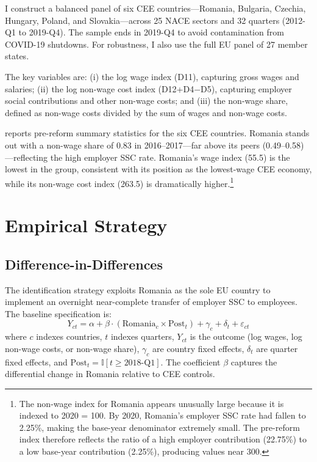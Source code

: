 \documentclass[12pt]{article}
\newcommand{\ind}{\mathbb{I}}
\begin{document}
I construct a balanced panel of six CEE countries---Romania, Bulgaria, Czechia, Hungary, Poland, and Slovakia---across 25 NACE sectors and 32 quarters (2012-Q1 to 2019-Q4). The sample ends in 2019-Q4 to avoid contamination from COVID-19 shutdowns. For robustness, I also use the full EU panel of 27 member states.

The key variables are: (i) the log wage index (D11), capturing gross wages and salaries; (ii) the log non-wage cost index (D12+D4$-$D5), capturing employer social contributions and other non-wage costs; and (iii) the non-wage share, defined as non-wage costs divided by the sum of wages and non-wage costs.

 reports pre-reform summary statistics for the six CEE countries. Romania stands out with a non-wage share of 0.83 in 2016--2017---far above its peers (0.49--0.58)---reflecting the high employer SSC rate. Romania's wage index (55.5) is the lowest in the group, consistent with its position as the lowest-wage CEE economy, while its non-wage cost index (263.5) is dramatically higher.\footnote{The non-wage index for Romania appears unusually large because it is indexed to 2020 = 100. By 2020, Romania's employer SSC rate had fallen to 2.25\%, making the base-year denominator extremely small. The pre-reform index therefore reflects the ratio of a high employer contribution (22.75\%) to a low base-year contribution (2.25\%), producing values near 300.}




\section{Empirical Strategy}

\subsection{Difference-in-Differences}

The identification strategy exploits Romania as the sole EU country to implement an overnight near-complete transfer of employer SSC to employees. The baseline specification is:
\begin{equation}
Y_{ct} = \alpha + \beta \cdot (\text{Romania}_c \times \text{Post}_t) + \gamma_c + \delta_t + \varepsilon_{ct}
\label{eq:did}
\end{equation}
where $c$ indexes countries, $t$ indexes quarters, $Y_{ct}$ is the outcome (log wages, log non-wage costs, or non-wage share), $\gamma_c$ are country fixed effects, $\delta_t$ are quarter fixed effects, and $\text{Post}_t = \ind[t \geq \text{2018-Q1}]$. The coefficient $\beta$ captures the differential change in Romania relative to CEE controls.
\end{document}
